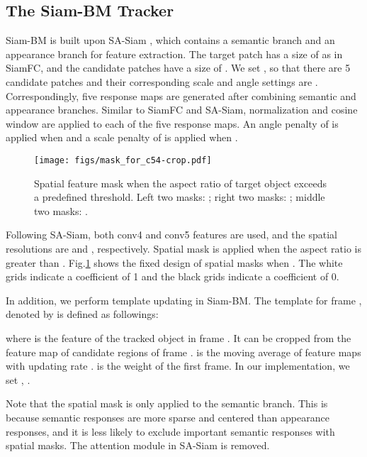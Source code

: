 \documentclass[runningheads]{llncs}
\begin{document}
    
\subsection{The Siam-BM Tracker}    

Siam-BM is built upon SA-Siam \cite{SASiam}, which contains a semantic branch and an appearance branch for feature extraction. The target patch has a size of  as in SiamFC, and the candidate patches have a size of . We set , so that there are 5 candidate patches and their corresponding scale and angle settings are . Correspondingly, five response maps are generated after combining semantic and appearance branches. Similar to SiamFC and SA-Siam, normalization and cosine window are applied to each of the five response maps. An angle penalty of  is applied when  and a scale penalty of  is applied when . 

\begin{figure}[th!]
    \begin{center}
    \texttt{[image: figs/mask\_for\_c54-crop.pdf]}
    \end{center}
    \caption{Spatial feature mask when the aspect ratio of target object exceeds a predefined threshold. Left two masks: ; right two masks: ; middle two masks: . }
    \label{fig:mask}
\end{figure}

Following SA-Siam, both conv4 and conv5 features are used, and the spatial resolutions are  and , respectively. Spatial mask is applied when the aspect ratio is greater than . Fig.\ref{fig:mask} shows the fixed design of spatial masks when . The white grids indicate a coefficient of 1 and the black grids indicate a coefficient of 0. 

In addition, we perform template updating in Siam-BM. The template for frame , denoted by  is defined as followings:


where  is the feature of the tracked object in frame . It can be cropped from the feature map of candidate regions of frame .  is the moving average of feature maps with updating rate .  is the weight of the first frame. In our implementation, we set , . 

Note that the spatial mask is only applied to the semantic branch. This is because semantic responses are more sparse and centered than appearance responses, and it is less likely to exclude important semantic responses with spatial masks. The attention module in SA-Siam is removed. 
\end{document}
